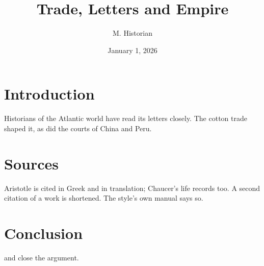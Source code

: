 \documentclass[12pt]{article}
\title{Trade, Letters and Empire}
\author{M. Historian}
\date{January 1, 2026}
\begin{document}
\maketitle
\section{Introduction}
Historians of the Atlantic world have read its letters closely.\autocite{centinel:letters}
The cotton trade shaped it,\autocite[45--47]{cotton:manufacture} as did
the courts of China\autocite{boxer:china} and Peru.\autocite{babb:peru}
\section{Sources}
Aristotle is cited in Greek\autocite{aristotle:metaphy:gr} and in
translation;\autocite{aristotle:metaphy:trans} Chaucer's life records
too.\autocite{chaucer:liferecords} A second citation of a work is
shortened.\autocite{boxer:china} The style's own manual
says so.\autocite[14.23]{chicago:manual}
\section{Conclusion}
\textcite{dunn:revolutions} and \textcite{davenport:attention} close the
argument.
\printbibliography
\end{document}
